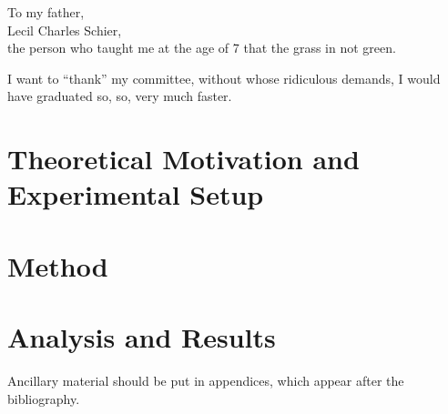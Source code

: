\documentclass[11pt]{ucthesis}
\begin{document}
\begin{frontmatter}
\begin{abstract}
\end{abstract}

\begin{dedication}
\null\vfil
{\large
\begin{center}
To my father,\\\vspace{12pt}
Lecil Charles Schier,\\\vspace{12pt}
the person who taught me at the age of 7 that the grass in not green.
\end{center}}
\vfil\null
\end{dedication}


\begin{acknowledgements}
I want to ``thank'' my committee, without whose ridiculous demands, I
would have graduated so, so, very much faster.
\end{acknowledgements}

\end{frontmatter}


\part{Theoretical Motivation and Experimental Setup}


\part{Method}





\part{Analysis and Results}







\nocite{*}



\appendix


Ancillary material should be put in appendices, which appear after the
bibliography. 
\end{document}
